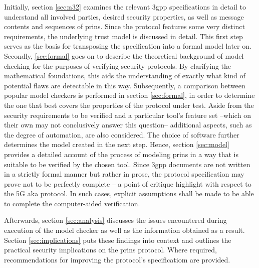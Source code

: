 Initially, section \ref{sec:n32} examines the relevant \gls{3gpp} specifications in detail to understand all involved parties, desired security properties, as well as message contents and sequences of \gls{prins}.
Since the protocol features some very distinct requirements, the underlying trust model is discussed in detail.
This first step serves as the basis for transposing the specification into a formal model later on.
Secondly, \ref{sec:formal} goes on to describe the theoretical background of model checking for the purposes of verifying security protocols.
By clarifying the mathematical foundations, this aids the understanding of exactly what kind of potential flaws are detectable in this way.
Subsequently, a comparison between popular model checkers is performed in section \ref{sec:formal}, in order to determine the one that best covers the properties of the protocol under test.
Aside from the security requirements to be verified and a particular tool's feature set --which on their own may not conclusively answer this question-- additional aspects, such as the degree of automation, are also considered.
The choice of software further determines the model created in the next step.
Hence, section \ref{sec:model} provides a detailed account of the process of modeling \gls{prins} in a way that is suitable to be verified by the chosen tool.
Since \gls{3gpp} documents are not written in a strictly formal manner but rather in prose, the protocol specification may prove not to be perfectly complete -- a point of critique \cite{basin2018model} highlight with respect to the 5G \gls{aka} protocol.
In such cases, explicit assumptions shall be made to be able to complete the computer-aided verification.

Afterwards, section \ref{sec:analysis} discusses the issues encountered during execution of the model checker as well as the information obtained as a result.
Section \ref{sec:implications} puts these findings into context and outlines the practical security implications on the \gls{prins} protocol.
Where required, recommendations for improving the protocol's specificatiom are provided.
